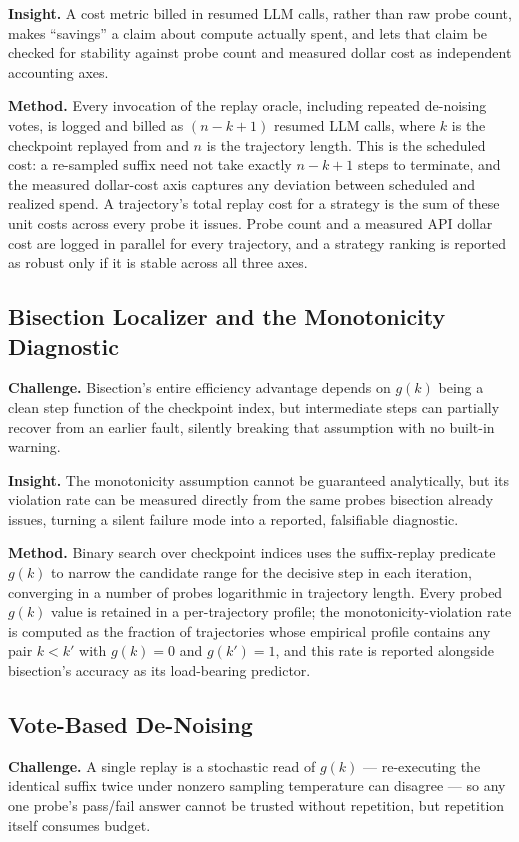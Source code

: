 \documentclass[11pt]{article}
\begin{document}
\textbf{Insight.} A cost metric billed in resumed LLM calls, rather than raw probe count, makes ``savings'' a claim about compute actually spent, and lets that claim be checked for stability against probe count and measured dollar cost as independent accounting axes.

\textbf{Method.} Every invocation of the replay oracle, including repeated de-noising votes, is logged and billed as $(n-k+1)$ resumed LLM calls, where $k$ is the checkpoint replayed from and $n$ is the trajectory length. This is the scheduled cost: a re-sampled suffix need not take exactly $n-k+1$ steps to terminate, and the measured dollar-cost axis captures any deviation between scheduled and realized spend. A trajectory's total replay cost for a strategy is the sum of these unit costs across every probe it issues. Probe count and a measured API dollar cost are logged in parallel for every trajectory, and a strategy ranking is reported as robust only if it is stable across all three axes.

\subsection{Bisection Localizer and the Monotonicity Diagnostic}
\textbf{Challenge.} Bisection's entire efficiency advantage depends on $g(k)$ being a clean step function of the checkpoint index, but intermediate steps can partially recover from an earlier fault, silently breaking that assumption with no built-in warning.

\textbf{Insight.} The monotonicity assumption cannot be guaranteed analytically, but its violation rate can be measured directly from the same probes bisection already issues, turning a silent failure mode into a reported, falsifiable diagnostic.

\textbf{Method.} Binary search over checkpoint indices uses the suffix-replay predicate $g(k)$ to narrow the candidate range for the decisive step in each iteration, converging in a number of probes logarithmic in trajectory length. Every probed $g(k)$ value is retained in a per-trajectory profile; the monotonicity-violation rate is computed as the fraction of trajectories whose empirical profile contains any pair $k<k'$ with $g(k)=0$ and $g(k')=1$, and this rate is reported alongside bisection's accuracy as its load-bearing predictor.

\subsection{Vote-Based De-Noising}
\textbf{Challenge.} A single replay is a stochastic read of $g(k)$ --- re-executing the identical suffix twice under nonzero sampling temperature can disagree --- so any one probe's pass/fail answer cannot be trusted without repetition, but repetition itself consumes budget.
\end{document}

